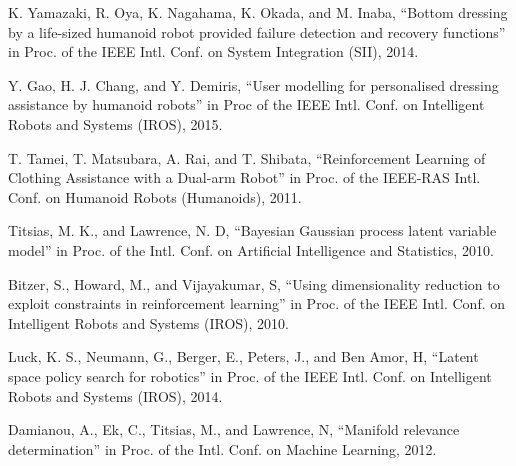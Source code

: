 \documentclass{article}
\begin{document}
\small

\begin{thebibliography}{15}
K. Yamazaki, R. Oya, K. Nagahama, K. Okada, and M. Inaba, ``Bottom dressing by a life-sized humanoid robot provided failure detection and recovery functions'' in Proc. of the IEEE Intl. Conf. on System Integration (SII), 2014.

Y. Gao, H. J. Chang, and Y. Demiris, ``User modelling for personalised dressing assistance by humanoid robots'' in Proc of the IEEE Intl. Conf. on Intelligent Robots and Systems (IROS), 2015.

T. Tamei, T. Matsubara, A. Rai, and T. Shibata, ``Reinforcement Learning of Clothing Assistance with a Dual-arm Robot'' in Proc. of the IEEE-RAS Intl. Conf. on Humanoid Robots (Humanoids), 2011.

Titsias, M. K., and Lawrence, N. D, ``Bayesian Gaussian process latent variable model'' in Proc. of the Intl. Conf. on Artificial Intelligence and Statistics, 2010.

Bitzer, S., Howard, M., and Vijayakumar, S, ``Using dimensionality reduction to exploit constraints in reinforcement learning'' in Proc. of the IEEE Intl. Conf. on Intelligent Robots and Systems (IROS), 2010.

Luck, K. S., Neumann, G., Berger, E., Peters, J., and Ben Amor, H, ``Latent space policy search for robotics'' in Proc. of the IEEE Intl. Conf. on Intelligent Robots and Systems (IROS), 2014.

Damianou, A., Ek, C., Titsias, M., and Lawrence, N, ``Manifold relevance determination'' in Proc. of the Intl. Conf. on Machine Learning, 2012.

\end{thebibliography}
\end{document}
